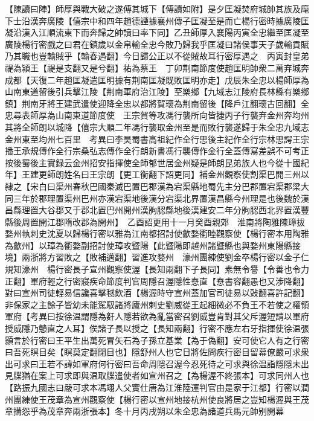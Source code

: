 【陳讀曰陣】師厚與戰大破之遂傅其城下【傅讀如附】是夕匡凝焚府城帥其族及麾下士沿漢奔廣陵【僖宗中和四年趙德諲據襄州傳子匡凝至是而亡楊行密時據廣陵匡凝沿漢入江順流東下而奔歸之帥讀曰率下同】乙丑師厚入襄陽丙寅全忠繼至匡凝至廣陵楊行密戲之曰君在鎮歲以金帛輸全忠今敗乃歸我乎匡凝曰諸侯事天子歲輸貢賦乃其職也豈輸賊乎【輸舂遇翻】今日歸公正以不從賊故耳行密厚遇之　丙寅封皇弟禔為潁王【禔是支翻又是兮翻】祐為蔡王　丁卯荆南節度使趙匡明帥衆二萬弃城奔成都【天復二年趙匡凝遣匡明據有荆南匡凝既敗匡明亦走】戊辰朱全忠以楊師厚為山南東道留後引兵擊江陵【荆南軍府治江陵】至樂鄉【九域志江陵府長林縣有樂鄉鎮】荆南牙將王建武遣使迎降全忠以都將賀瓌為荆南留後【降戶江翻瓌古回翻】全忠尋表師厚為山南東道節度使　王宗賀等攻馮行襲所向皆捷丙子行襲弃金州奔均州其將全師朗以城降【僖宗大順二年馮行襲取金州至是而敗行襲遂歸于朱全忠九域志金州東至均州七百里　考異曰李昊蜀書高祖紀作全行思後主紀作全行宗林思諤王宗播王承規傳作全行宗桑弘志傳作全行朗新書馮行襲傳作金行全蓋傳寫差誤不可考正按後蜀後主實録云金州招安指揮使全師郁世居金州疑是師朗昆弟族人也今從十國紀年】王建更師朗姓名曰王宗朗【更工衡翻下詔更同】補金州觀察使割渠巴開三州以隸之【宋白曰渠州春秋巴國秦滅巴置巴郡漢為宕渠縣地蜀先主分巴郡置宕渠郡梁大同三年於郡理置渠州巴州亦漢宕渠地後漢分宕渠北界置漢昌縣今州理是也後魏於漢昌縣理置大谷郡又于郡北置巴州開州漢朐䏰縣地後漢建安二年分朐䏰西北界置漢豐縣後周置開江郡隋改郡為開州】　乙酉詔更用十一月癸酉親郊　淮南將陶雅陳璋拔婺州執刺史沈夏以歸楊行密以雅為江南都招討使歙婺衢睦觀察使【楊行密本用陶雅為歙州】以璋為衢婺副招討使璋攻暨陽【此暨陽即越州諸暨縣也與婺州東陽縣接境】兩浙將方習敗之【敗補邁翻】習進攻婺州　濠州團練使劉金卒楊行密以金子仁規知濠州　楊行密長子宣州觀察使渥【長知兩翻下子長同】素無令譽【令善也令力正翻】軍府輕之行密寢疾命節度判官周隱召渥隱性憃直【憃書容翻愚也又涉降翻】對曰宣州司徒輕易信讒喜擊毬飲酒【楊渥時守宣州蓋加官司徒易以䜴翻喜許記翻】非保家之主餘子皆幼未能駕馭諸將廬州刺史劉威從王起細微必不負王不若使之權領軍府【考異曰按徐温謂隱為姧人隱若欲為亂當密召劉威豈肯對其父斥渥短請以軍府授威隱乃戇直之人耳】俟諸子長以授之【長知兩翻】行密不應左右牙指揮使徐温張顥言於行密曰王平生出萬死冒矢石為子孫立基業【為于偽翻】安可使它人有之行密曰吾死瞑目矣【瞑莫定翻閉目也】隱舒州人也它日將佐問疾行密目留幕僚嚴可求衆出可求曰王若不諱如軍府何行密曰吾命周隱召渥今忍死待之可求與徐温詣隱隱未出見牒猶在案上可求即與温取牒遣使者如宣州召之【為楊渥不終張本】可求同州人也【路振九國志曰嚴可求本馮翊人父實仕唐為江淮陸運判官由是家于江都】行密以潤州團練使王茂章為宣州觀察使【楊行密以宣州地接杭州使良將居之豈知楊渥與王茂章搆怨乎為茂章奔兩浙張本】冬十月丙戌朔以朱全忠為諸道兵馬元帥别開幕


